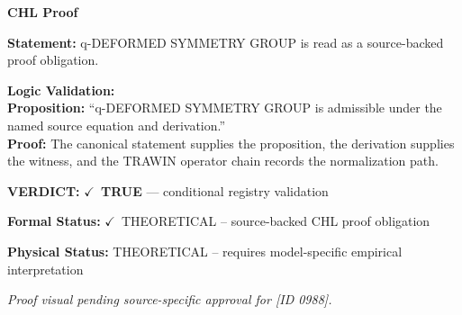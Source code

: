 \vspace{0.45em}
\noindent\textbf{CHL Proof}\par
\textbf{Statement:} q-DEFORMED SYMMETRY GROUP is read as a source-backed proof obligation.

\textbf{Logic Validation:}\\
\textbf{Proposition:} ``q-DEFORMED SYMMETRY GROUP is admissible under the named source equation and derivation.''\\
\textbf{Proof:} The canonical statement supplies the proposition, the derivation supplies the witness, and the TRAWIN operator chain records the normalization path.

\textbf{VERDICT:} \ensuremath{\checkmark}\ \textbf{TRUE} --- conditional registry validation

\textbf{Formal Status:} \ensuremath{\checkmark}\ THEORETICAL -- source-backed CHL proof obligation

\textbf{Physical Status:} THEORETICAL -- requires model-specific empirical interpretation
\par\vspace{0.45em}
\par
\vfill
\begingroup\footnotesize\itshape
Proof visual pending source-specific approval for [ID 0988].
\par\endgroup
\vfill
\endgroup
\endgroup
